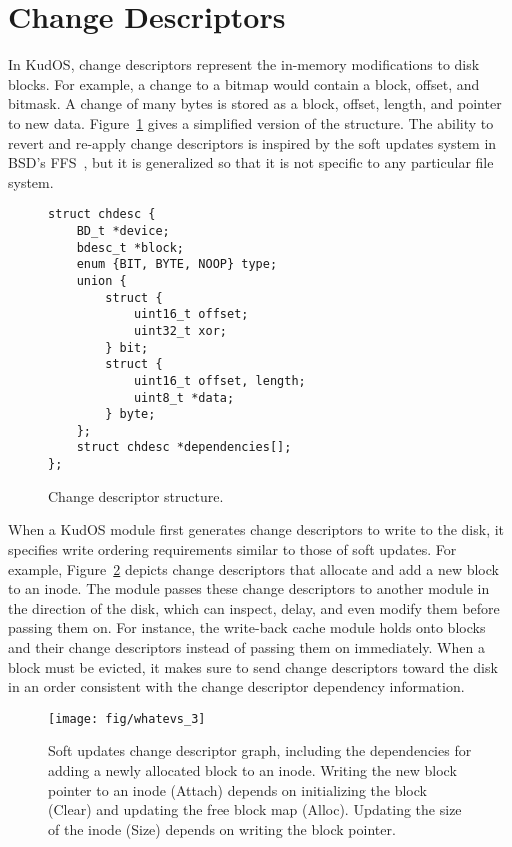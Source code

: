 \preparagraphspacing{}
\section*{Change Descriptors}
\label{sec:chdescs}

In KudOS, change descriptors represent the in-memory modifications to
disk blocks. For example, a change to a bitmap would contain a block,
offset, and bitmask. A change of many bytes is stored as a block,
offset, length, and pointer to new data. Figure~\ref{fig:chdesc} gives
a simplified version of the structure. The ability to revert and
re-apply change descriptors is inspired by the soft updates system in
BSD's FFS~\cite{ganger00soft}, but it is generalized so that it is not
specific to any particular file system.

\begin{figure}
{\footnotesize
\begin{verbatim}
struct chdesc {
    BD_t *device;
    bdesc_t *block;
    enum {BIT, BYTE, NOOP} type;
    union {
        struct {
            uint16_t offset;
            uint32_t xor;
        } bit;
        struct {
            uint16_t offset, length;
            uint8_t *data;
        } byte;
    };
    struct chdesc *dependencies[];
};
\end{verbatim}
}
\vspace{-14pt}
\caption{\label{fig:chdesc} Change descriptor structure.}
\end{figure}

When a KudOS module first generates change descriptors to write to the disk, it
specifies write ordering requirements similar to those of soft updates. For
example, Figure~\ref{fig:softupdates} depicts change descriptors that allocate
and add a new block to an inode.
%
The module passes these change descriptors to another module in the direction of
the disk, which can inspect, delay, and even modify them before passing them on.
%
For instance, the write-back cache module holds onto blocks and their change
descriptors instead of passing them on immediately.
%
When a block must be evicted, it makes sure to send change descriptors toward
the disk in an order consistent with the change descriptor dependency
information.

\begin{figure}[b]
  \centering
  \texttt{[image: fig/whatevs\_3]}%
  \caption{\label{fig:softupdates} Soft updates change descriptor graph,
  including the dependencies for adding a newly allocated block to an
  inode. Writing the new block pointer to an inode (Attach) depends on
  initializing the block (Clear) and updating the free block map (Alloc).
  Updating the size of the inode (Size) depends on writing the block
  pointer.}
\end{figure}

